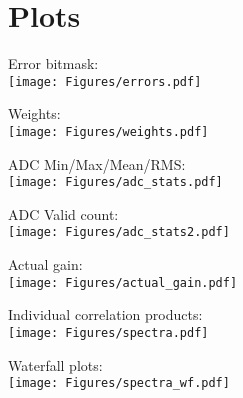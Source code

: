 \section{Plots}

Error bitmask:\\
\texttt{[image: Figures/errors.pdf]}

Weights:\\
\texttt{[image: Figures/weights.pdf]}

ADC Min/Max/Mean/RMS:\\
\texttt{[image: Figures/adc\_stats.pdf]}

ADC Valid count:\\
\texttt{[image: Figures/adc\_stats2.pdf]}

Actual gain:\\
\texttt{[image: Figures/actual\_gain.pdf]}


Individual correlation products:\\
\texttt{[image: Figures/spectra.pdf]}

\newpage
Waterfall plots:\\
\texttt{[image: Figures/spectra\_wf.pdf]}


